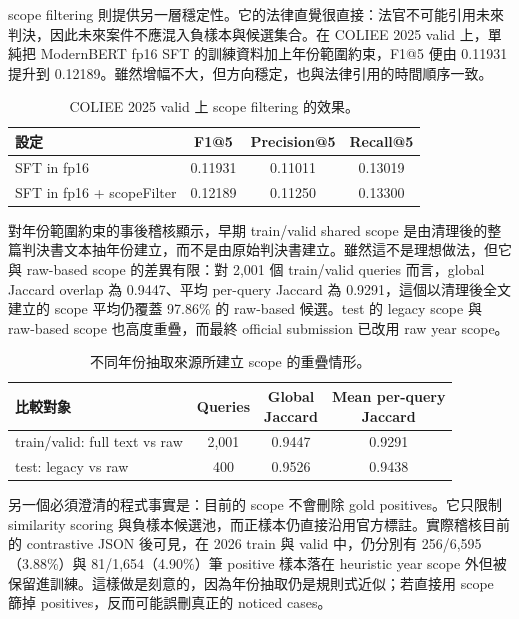 scope filtering 則提供另一層穩定性。它的法律直覺很直接：法官不可能引用未來判決，因此未來案件不應混入負樣本與候選集合。在 COLIEE 2025 valid 上，單純把 ModernBERT fp16 SFT 的訓練資料加上年份範圍約束，F1@5 便由 0.11931 提升到 0.12189。雖然增幅不大，但方向穩定，也與法律引用的時間順序一致。

\begin{table}[t]
  \centering
  \small
  \begin{tabular}{lccc}
    \toprule
    設定 & F1@5 & Precision@5 & Recall@5 \\
    \midrule
    SFT in fp16 & 0.11931 & 0.11011 & 0.13019 \\
    SFT in fp16 + scopeFilter & 0.12189 & 0.11250 & 0.13300 \\
    \bottomrule
  \end{tabular}
  \caption{COLIEE 2025 valid 上 scope filtering 的效果。}
  \label{tab:scopefilter-effect}
\end{table}

對年份範圍約束的事後稽核顯示，早期 train/valid shared scope 是由清理後的整篇判決書文本抽年份建立，而不是由原始判決書建立。雖然這不是理想做法，但它與 raw-based scope 的差異有限：對 2,001 個 train/valid queries 而言，global Jaccard overlap 為 0.9447、平均 per-query Jaccard 為 0.9291，這個以清理後全文建立的 scope 平均仍覆蓋 97.86\% 的 raw-based 候選。test 的 legacy scope 與 raw-based scope 也高度重疊，而最終 official submission 已改用 raw year scope。

\begin{table}[t]
  \centering
  \scriptsize
  \begin{tabular}{@{}p{}ccc@{}}
    \toprule
    比較對象 & Queries & \shortstack{Global\\Jaccard} & \shortstack{Mean per-query\\Jaccard} \\
    \midrule
    train/valid: full text vs raw & 2,001 & 0.9447 & 0.9291 \\
    test: legacy vs raw & 400 & 0.9526 & 0.9438 \\
    \bottomrule
  \end{tabular}
  \caption{不同年份抽取來源所建立 scope 的重疊情形。}
  \label{tab:scope-overlap}
\end{table}

另一個必須澄清的程式事實是：目前的 scope 不會刪除 gold positives。它只限制 similarity scoring 與負樣本候選池，而正樣本仍直接沿用官方標註。實際稽核目前的 contrastive JSON 後可見，在 2026 train 與 valid 中，仍分別有 256/6,595（3.88\%）與 81/1,654（4.90\%）筆 positive 樣本落在 heuristic year scope 外但被保留進訓練。這樣做是刻意的，因為年份抽取仍是規則式近似；若直接用 scope 篩掉 positives，反而可能誤刪真正的 noticed cases。

